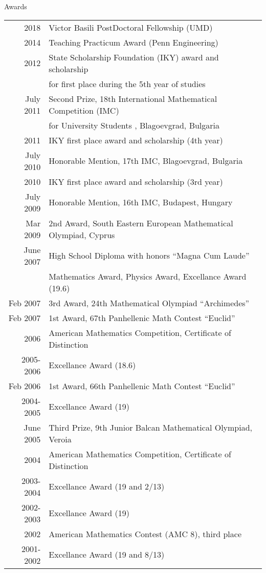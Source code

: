 \documentclass{resume} %
\begin{document}
\begin{rSection}{Awards}

  \begin{longtable}{rl}
  2018 & Victor Basili PostDoctoral Fellowship (UMD)\\
  2014	 & Teaching Practicum Award (Penn Engineering) \\
  2012 & State Scholarship Foundation (IKY) award and scholarship \\
       & for first place during the 5th year of studies \\
  July  2011  &  Second  Prize,  18th  International Mathematical Competition (IMC) \\
  &  for University Students , Blagoevgrad, Bulgaria \\
  2011 & IKY first place award and scholarship (4th year)\\
  July 2010 &  Honorable Mention,  17th IMC, Blagoevgrad, Bulgaria \\
  2010 & IKY first place award and scholarship (3rd year)\\
  July 2009 &  Honorable Mention,  16th IMC, Budapest, Hungary\\
  Mar 2009  &  2nd Award, South Eastern European Mathematical Olympiad, Cyprus\\

  June  2007 &   High  School  Diploma with  honors  “Magna  Cum  Laude”\\
             &   Mathematics Award, Physics Award,  Excellance Award (19.6)\\
  Feb 2007 &  3rd Award, 24th Mathematical Olympiad “Archimedes”\\
  Feb 2007 &  1st Award, 67th Panhellenic Math Contest “Euclid”\\
  2006 &  American Mathematics Competition, Certificate of Distinction\\
  2005-2006 &  Excellance Award (18.6)\\
  Feb 2006 &  1st Award, 66th Panhellenic Math Contest “Euclid”\\
  2004-2005 &  Excellance Award (19)\\
  June 2005 &  Third Prize, 9th Junior Balcan Mathematical Olympiad, Veroia\\
  2004 &  American Mathematics Competition, Certificate of Distinction\\
  2003-2004&  Excellance Award (19 and 2/13)\\
  2002-2003&  Excellance Award (19)\\
  2002 & American Mathematics Contest (AMC 8), third place\\
  2001-2002&  Excellance Award (19 and 8/13)\\
  
\end{longtable}

\end{rSection}
\end{document}
